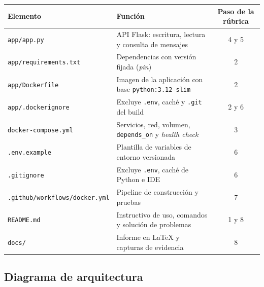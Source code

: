 \documentclass[12pt,a4paper]{article}
\begin{document}
\begin{center}
\small
\begin{tabularx}{\textwidth}{@{}>{\small\ttfamily\raggedright\arraybackslash}p{4.4cm} >{\small}X >{\small}c@{}}
\toprule
\textbf{Elemento} & \textbf{Funci\'on} & \textbf{Paso de la r\'ubrica} \\
\midrule
\texttt{app/app.py} & API Flask: escritura, lectura y consulta de mensajes & 4 y 5 \\
\texttt{app/requirements.txt} & Dependencias con versi\'on fijada (\textit{pin}) & 2 \\
\texttt{app/Dockerfile} & Imagen de la aplicaci\'on con base \texttt{python:3.12-slim} & 2 \\
\texttt{app/.dockerignore} & Excluye \texttt{.env}, cach\'e y \texttt{.git} del build & 2 y 6 \\
\texttt{docker-compose.yml} & Servicios, red, volumen, \texttt{depends\_on} y \emph{health check} & 3 \\
\texttt{.env.example} & Plantilla de variables de entorno versionada & 6 \\
\texttt{.gitignore} & Excluye \texttt{.env}, cach\'e de Python e IDE & 6 \\
\texttt{.github/workflows/}\newline\texttt{docker.yml} & Pipeline de construcci\'on y pruebas & 7 \\
\texttt{README.md} & Instructivo de uso, comandos y soluci\'on de problemas & 1 y 8 \\
\texttt{docs/} & Informe en LaTeX y capturas de evidencia & 8 \\
\bottomrule
\end{tabularx}
\end{center}

\subsection{Diagrama de arquitectura}
\end{document}
